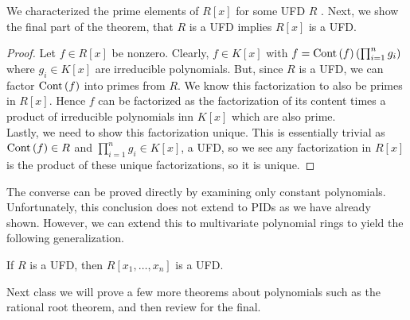 \begin{recall}
	We characterized the prime elements of \(R\left[ x \right] \) for some UFD \(R\) . Next, we show the final part of the theorem, that \(R\) is a UFD implies \(R\left[ x \right] \) is a UFD.
\end{recall}
\begin{proof}
	Let \(f \in R\left[ x \right] \) be nonzero. Clearly, \(f \in K\left[ x \right] \) with \(f = \operatorname{Cont}\left( f \right) \left( \prod_{i= 1}^{n} g_{i}  \right) \) where \(g_{i} \in K\left[ x \right] \) are irreducible polynomials. But, since \(R\) is a UFD, we can factor \(\operatorname{Cont}\left( f \right) \) into primes from \(R\). We know this factorization to also be primes in \(R\left[ x \right] \). Hence \(f\) can be factorized as the factorization of its content times a product of irreducible polynomials inn \(K\left[ x \right] \) which are also prime.\\
	Lastly, we need to show this factorization unique. This is essentially trivial as \(\operatorname{Cont}\left( f \right) \in R\) and \(\prod_{i= 1}^{n} g_{i} \in K\left[ x \right]  \), a UFD, so we see any factorization in \(R\left[ x \right] \) is the product of these unique factorizations, so it is unique.
\end{proof}
The converse can be proved directly by examining only constant polynomials.\\
Unfortunately, this conclusion does not extend to PIDs as we have already shown. However, we can extend this to multivariate polynomial rings to yield the following generalization.
\begin{corollary}
	If \(R\) is a UFD, then \(R\left[ x_1, \ldots, x_{n} \right] \) is a UFD.
\end{corollary}

Next class we will prove a few more theorems about polynomials such as the rational root theorem, and then review for the final.
